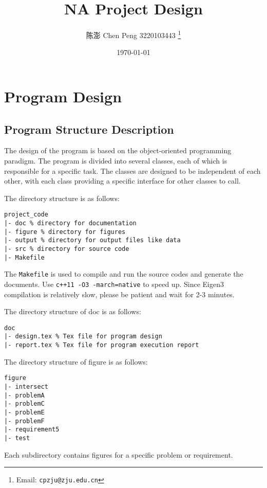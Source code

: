 \documentclass[a4paper]{article}
\begin{document}
\begin{sloppypar}
\title{NA Project Design}

\author{陈澎 Chen Peng 3220103443
  \thanks{Email: \texttt{cpzju@zju.edu.cn}}}

\date{\today}

\maketitle

\section{Program Design}
\subsection{Program Structure Description}
The design of the program is based on the object-oriented programming paradigm.
The program is divided into several classes, each of which is responsible for a
specific task. The classes are designed to be independent of each other, with
each class providing a specific interface for other classes to call.

The directory structure is as follows:
\begin{lstlisting}
project_code
|- doc % directory for documentation
|- figure % directory for figures
|- output % directory for output files like data
|- src % directory for source code
|- Makefile
\end{lstlisting}

The \verb|Makefile| is used to compile and run the source codes and generate the documents. 
Use \verb|c++11 -O3 -march=native| to speed up. Since Eigen3 compilation is relatively slow, please be patient and wait for 2-3 minutes.

The directory structure of doc is as follows:
\begin{lstlisting}
doc
|- design.tex % Tex file for program design
|- report.tex % Tex file for program execution report
\end{lstlisting}

The directory structure of figure is as follows:
\begin{lstlisting}
figure
|- intersect
|- problemA
|- problemC
|- problemE
|- problemF
|- requirement5
|- test
\end{lstlisting}
Each subdirectory contains figures for a specific problem or requirement.


\end{sloppypar}
\end{document}
